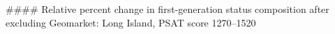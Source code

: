 #### Relative percent change in first-generation status composition after excluding Geomarket: Long Island, PSAT score 1270–1520
